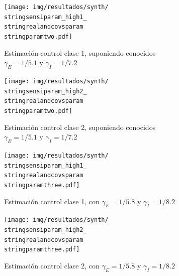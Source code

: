 \begin{figure}[!h]
\centering
\begin{subfigure}[b]{0.47\textwidth}
     \centering
     \texttt{[image: img/resultados/synth/\\stringsensiparam\_high1\_\\stringrealandcovsparam\\stringparamtwo.pdf]}
     \caption{Estimación control clase 1, suponiendo conocidos \(\gamma_E = 1/5.1\) y \(\gamma_I = 1/7.2\)}
     \label{fig:legend-sensi-b-class1-gamma_real}
\end{subfigure} 
\hfill
\begin{subfigure}[b]{0.47\textwidth}
     \centering
     \texttt{[image: img/resultados/synth/\\stringsensiparam\_high2\_\\stringrealandcovsparam\\stringparamtwo.pdf]}
     \caption{Estimación control clase 2,  suponiendo conocidos \(\gamma_E = 1/5.1\) y \(\gamma_I = 1/7.2\)}
     \label{fig:legend-sensi-b-class2-gamma_real}
\end{subfigure} 
\hfill
\begin{subfigure}[b]{0.47\textwidth}
     \centering
     \texttt{[image: img/resultados/synth/\\stringsensiparam\_high1\_\\stringrealandcovsparam\\stringparamthree.pdf]}
     \caption{Estimación control clase 1,  con \(\gamma_E = 1/5.8\) y \(\gamma_I = 1/8.2\)}
     \label{fig:legend-sensi-b-class1-gamma_estimado}
\end{subfigure} 
\hfill
\begin{subfigure}[b]{0.47\textwidth}
     \centering
     \texttt{[image: img/resultados/synth/\\stringsensiparam\_high2\_\\stringrealandcovsparam\\stringparamthree.pdf]}
     \caption{Estimación control clase 2,  con \(\gamma_E = 1/5.8\) y \(\gamma_I = 1/8.2\)}
     \label{fig:legend-sensi-b-class2-gamma_estimado}
\end{subfigure} 
\hfill
\begin{subfigure}[b]{0.75\textwidth}
 \centering
{}
\end{subfigure}
\end{figure}

